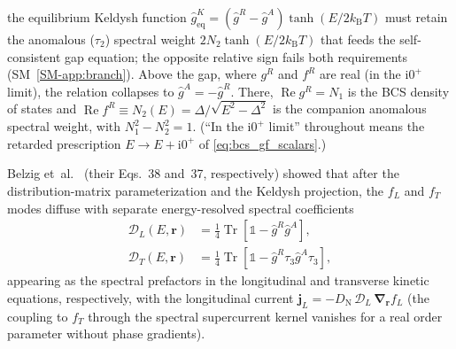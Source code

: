 \documentclass[
  aps,
  prb,
  preprint,
  superscriptaddress,
  longbibliography,
  nofootinbib
]{revtex4-2}
\newcommand{\ii}{\mathrm{i}}
\newcommand{\Tr}{\operatorname{Tr}}
\newcommand{\br}{\mathbf{r}}
\newcommand{\bnabla}{\boldsymbol{\nabla}}
\newcommand{\DOS}{N_1}
\newcommand{\DN}{D_{\mathrm{N}}}
\newcommand{\fL}{f_L}
\newcommand{\fT}{f_T}
\providecommand{\openone}{}\renewcommand{\openone}{\mathds{1}}
\newcommand{\Real}{\operatorname{Re}}
\begin{document}
the equilibrium Keldysh function
\(\hat{g}^K_{\mathrm{eq}}=(\hat{g}^R-\hat{g}^A)\tanh(E/2k_{\mathrm B}T)\) must retain
the anomalous (\(\tau_2\)) spectral weight \(2N_2\tanh(E/2k_{\mathrm B}T)\) that feeds
the self-consistent gap equation; the opposite relative sign fails both
requirements (SM~\cref{SM-app:branch}). Above the gap, where \(g^R\) and
\(f^R\) are real (in the \(\ii0^{+}\) limit), the relation collapses to
\(\hat{g}^A=-\hat{g}^R\). There, \(\Real g^R=\DOS\) is the BCS density of
states and \(\Real f^R\equiv N_2(E)=\Delta/\sqrt{E^2-\Delta^2}\) is the
companion anomalous spectral weight, with \(\DOS^2-N_2^2=1\).
(``In the \(\ii0^{+}\) limit'' throughout means the retarded prescription
\(E\to E+\ii0^{+}\) of \cref{eq:bcs_gf_scalars}.)

Belzig et~al.~\cite{belzig1999} (their Eqs.~38 and~37, respectively)
showed that after the
distribution-matrix parameterization and the Keldysh projection, the
\(\fL\) and \(\fT\) modes diffuse with separate energy-resolved spectral
coefficients
\begin{align}
  \mathcal{D}_L(E,\br)
  &=
  \tfrac{1}{4}\Tr\!\left[\openone-\hat{g}^R\hat{g}^A\right],
  \label{eq:DL_definition}
  \\
  \mathcal{D}_T(E,\br)
  &=
  \tfrac{1}{4}\Tr\!\left[\openone-\hat{g}^R\tau_3\hat{g}^A\tau_3\right],
  \label{eq:DT_definition}
\end{align}
appearing as the spectral prefactors in the longitudinal and transverse
kinetic equations, respectively, with the longitudinal current
\(\mathbf{j}_L=-\DN\,\mathcal{D}_L\,\bnabla_{\br}\fL\) (the coupling to
\(\fT\) through the spectral supercurrent kernel vanishes for a real order
parameter without phase gradients).
\end{document}
